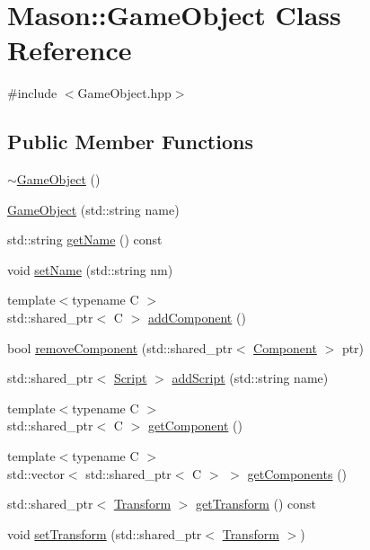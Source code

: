 \hypertarget{class_mason_1_1_game_object}{}\section{Mason\+:\+:Game\+Object Class Reference}
\label{class_mason_1_1_game_object}


{\ttfamily \#include $<$Game\+Object.\+hpp$>$}

\subsection*{Public Member Functions}
\begin{DoxyCompactItemize}
\item 
\hyperlink{class_mason_1_1_game_object_ab82dfdb656f9051c0587e6593b2dda97}{$\sim$\+Game\+Object} ()
\item 
\hyperlink{class_mason_1_1_game_object_a0737657696b478c7962c2a6c2f5b1bd8}{Game\+Object} (std\+::string name)
\item 
std\+::string \hyperlink{class_mason_1_1_game_object_a7b5b5ca6b3754cdfb175cd1938c77f10}{get\+Name} () const
\item 
void \hyperlink{class_mason_1_1_game_object_af478034e4602956fc936ee4fbe05d107}{set\+Name} (std\+::string nm)
\item 
{\footnotesize template$<$typename C $>$ }\\std\+::shared\+\_\+ptr$<$ C $>$ \hyperlink{class_mason_1_1_game_object_a4df82cecf4dc31163f04bf01043a1ec8}{add\+Component} ()
\item 
bool \hyperlink{class_mason_1_1_game_object_af22f654507a0f6a5056c0d99bc6cd1b8}{remove\+Component} (std\+::shared\+\_\+ptr$<$ \hyperlink{class_mason_1_1_component}{Component} $>$ ptr)
\item 
std\+::shared\+\_\+ptr$<$ \hyperlink{class_mason_1_1_script}{Script} $>$ \hyperlink{class_mason_1_1_game_object_a2c351c8c573724821be9bb14807e65ef}{add\+Script} (std\+::string name)
\item 
{\footnotesize template$<$typename C $>$ }\\std\+::shared\+\_\+ptr$<$ C $>$ \hyperlink{class_mason_1_1_game_object_aa716fbc3fd56fe4f65c85d777ac62eb0}{get\+Component} ()
\item 
{\footnotesize template$<$typename C $>$ }\\std\+::vector$<$ std\+::shared\+\_\+ptr$<$ C $>$ $>$ \hyperlink{class_mason_1_1_game_object_a4c013ffa8f4925e42541b462490e4dca}{get\+Components} ()
\item 
std\+::shared\+\_\+ptr$<$ \hyperlink{class_mason_1_1_transform}{Transform} $>$ \hyperlink{class_mason_1_1_game_object_af1eeaf1920ea84b369cfa9bfd69754df}{get\+Transform} () const
\item 
void \hyperlink{class_mason_1_1_game_object_a354c553749dffb59fbe763f4bf26341d}{set\+Transform} (std\+::shared\+\_\+ptr$<$ \hyperlink{class_mason_1_1_transform}{Transform} $>$)
\end{DoxyCompactItemize}
